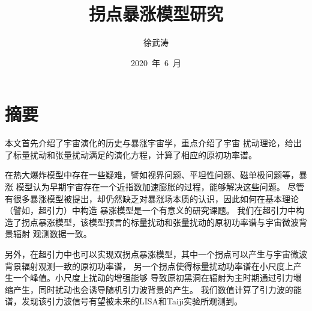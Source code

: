 \confidential{}%
\title{拐点暴涨模型研究}%
\author{徐武涛}%
\date{2020~年~6~月}%
\maketitle%
\MAKETITLE%
\makedeclaration%
\intobmk\chapter*{摘\quad 要}%
\setcounter{page}{1}%


本文首先介绍了宇宙演化的历史与暴涨宇宙学，重点介绍了宇宙
扰动理论，给出了标量扰动和张量扰动满足的演化方程，计算了相应的原初功率谱。

在热大爆炸模型中存在一些疑难，譬如视界问题、平坦性问题、磁单极问题等，暴涨
模型认为早期宇宙存在一个近指数加速膨胀的过程，能够解决这些问题。
尽管有很多暴涨模型被提出，却仍然缺乏对暴涨场本质的认识，因此如何在基本理论（譬如，超引力）中构造
暴涨模型是一个有意义的研究课题。
我们在超引力中构造了拐点暴涨模型，该模型预言的标量扰动和张量扰动的原初功率谱与宇宙微波背景辐射
观测数据一致。

另外，在超引力中也可以实现双拐点暴涨模型，其中一个拐点可以产生与宇宙微波背景辐射观测一致的原初功率谱，
另一个拐点使得标量扰动功率谱在小尺度上产生一个峰值。小尺度上扰动的增强能够
导致原初黑洞在辐射为主时期通过引力塌缩产生，同时扰动也会诱导随机引力波背景的产生。
我们数值计算了引力波的能谱，发现该引力波信号有望被未来的LISA和Taiji实验所观测到。

